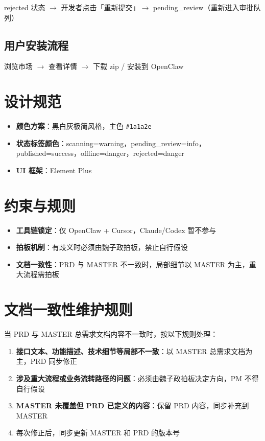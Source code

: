 \documentclass[11pt,a4paper]{article}
\begin{document}
rejected 状态 $\to$ 开发者点击「重新提交」$\to$ pending\_review（重新进入审批队列）

\subsection{用户安装流程}

浏览市场 $\to$ 查看详情 $\to$ 下载 zip / 安装到 OpenClaw

\section{设计规范}

\begin{itemize}[nosep]
  \item \textbf{颜色方案}：黑白灰极简风格，主色 \texttt{\#1a1a2e}
  \item \textbf{状态标签颜色}：scanning=warning，pending\_review=info，published=success，offline=danger，rejected=danger
  \item \textbf{UI 框架}：Element Plus
\end{itemize}

\section{约束与规则}

\begin{itemize}[nosep]
  \item \textbf{工具链锁定}：仅 OpenClaw + Cursor，Claude/Codex 暂不参与
  \item \textbf{拍板机制}：有歧义时必须由魏子政拍板，禁止自行假设
  \item \textbf{文档一致性}：PRD 与 MASTER 不一致时，局部细节以 MASTER 为主，重大流程需拍板
\end{itemize}

\section{文档一致性维护规则}

当 PRD 与 MASTER 总需求文档内容不一致时，按以下规则处理：
\begin{enumerate}[nosep]
  \item \textbf{接口文本、功能描述、技术细节等局部不一致}：以 MASTER 总需求文档为主，PRD 同步修正
  \item \textbf{涉及重大流程或业务流转路径的问题}：必须由魏子政拍板决定方向，PM 不得自行假设
  \item \textbf{MASTER 未覆盖但 PRD 已定义的内容}：保留 PRD 内容，同步补充到 MASTER
  \item 每次修正后，同步更新 MASTER 和 PRD 的版本号
\end{enumerate}
\end{document}
